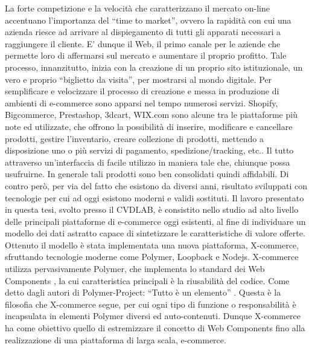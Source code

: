 \newline
La forte competizione e la velocità che caratterizzano il mercato on-line accentuano l’importanza del “time to market”, ovvero la rapidità con cui una azienda riesce ad arrivare al dispiegamento di tutti gli apparati necessari a raggiungere il cliente.
\newline
E' dunque il Web, il primo canale per le aziende che permette loro di affermarsi sul mercato e aumentare il proprio profitto.
Tale processo, innanzitutto, inizia con la creazione di un proprio sito istituzionale, un vero e proprio “biglietto da visita”, per mostrarsi al mondo digitale.
\newline
Per semplificare e velocizzare il processo di creazione e messa in produzione di ambienti di e-commerce sono apparsi nel tempo numerosi servizi.
\newline
Shopify, Bigcommerce, Prestashop, 3dcart, WIX.com sono alcune tra le piattaforme più note ed utilizzate, che offrono la possibilità di inserire, modificare e cancellare prodotti, gestire l’inventario, creare collezione di prodotti, mettendo a disposizione uno o più servizi di pagamento, spedizione/tracking, etc.. Il tutto attraverso un’interfaccia di facile utilizzo in maniera tale che, chiunque possa usufruirne.
\newline
In generale tali prodotti sono ben consolidati quindi affidabili. Di contro però, per via del fatto che esistono da diversi anni, risultato sviluppati con tecnologie per cui ad oggi esistono moderni e validi sostituti.
\newline
Il lavoro presentato in questa tesi, svolto presso il CVDLAB, è consistito nello studio ad alto livello delle principali piattaforme di e-commerce oggi esistenti, al fine di individuare un modello dei dati astratto capace di sintetizzare le caratteristiche di valore offerte.
Ottenuto il modello è stata implementata una nuova piattaforma, X-commerce, sfruttando
tecnologie moderne come Polymer, Loopback e Nodejs.
\newline
X-commerce utilizza pervasivamente Polymer, che implementa lo standard dei Web Components \cite{web_comt_std}, la cui caratteristica principali è la riusabilità del codice.
Come detto dagli autori di Polymer-Project: “Tutto è un elemento” \cite{polymer_world_view}. Questa è la filosofia che X-commerce segue, per cui ogni tipo di funzione o responsabilità è incapsulata in elementi Polymer diversi ed auto-contenuti.
Dunque X-commerce ha come obiettivo  quello di estremizzare il concetto di Web Components fino alla realizzazione di una piattaforma di larga scala, e-commerce.
